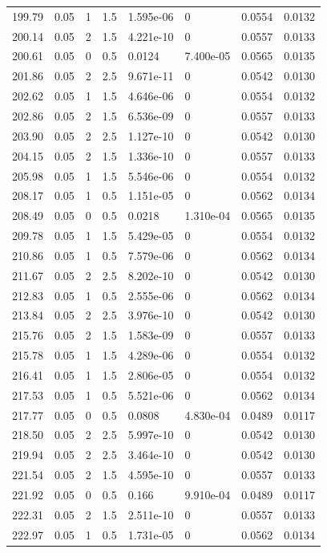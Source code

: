 \documentclass[preview]{standalone}
\begin{document}
{{{{\begin{tabular}{L{1.2cm}C{1.2cm} C{0.3cm}C{0.5cm} C{1.4cm}C{1.4cm} C{1.4cm}C{1.4cm}}
  199.79  &  0.05  & 1     & 1.5 &  1.595e-06  & 0  & 0.0554 &  0.0132   \\ 
  200.14  &  0.05  & 2     & 1.5 &  4.221e-10  & 0  & 0.0557 &  0.0133   \\ 
  200.61  &  0.05  & 0     & 0.5 &  0.0124  & 7.400e-05  & 0.0565 &  0.0135   \\ 
  201.86  &  0.05  & 2     & 2.5 &  9.671e-11  & 0  & 0.0542 &  0.0130   \\ 
  202.62  &  0.05  & 1     & 1.5 &  4.646e-06  & 0  & 0.0554 &  0.0132   \\ 
  202.86  &  0.05  & 2     & 1.5 &  6.536e-09  & 0  & 0.0557 &  0.0133   \\ 
  203.90  &  0.05  & 2     & 2.5 &  1.127e-10  & 0  & 0.0542 &  0.0130   \\ 
  204.15  &  0.05  & 2     & 1.5 &  1.336e-10  & 0  & 0.0557 &  0.0133   \\ 
  205.98  &  0.05  & 1     & 1.5 &  5.546e-06  & 0  & 0.0554 &  0.0132   \\ 
  208.17  &  0.05  & 1     & 0.5 &  1.151e-05  & 0  & 0.0562 &  0.0134   \\ 
  208.49  &  0.05  & 0     & 0.5 &  0.0218  & 1.310e-04  & 0.0565 &  0.0135   \\ 
  209.78  &  0.05  & 1     & 1.5 &  5.429e-05  & 0  & 0.0554 &  0.0132   \\ 
  210.86  &  0.05  & 1     & 0.5 &  7.579e-06  & 0  & 0.0562 &  0.0134   \\ 
  211.67  &  0.05  & 2     & 2.5 &  8.202e-10  & 0  & 0.0542 &  0.0130   \\ 
  212.83  &  0.05  & 1     & 0.5 &  2.555e-06  & 0  & 0.0562 &  0.0134   \\ 
  213.84  &  0.05  & 2     & 2.5 &  3.976e-10  & 0  & 0.0542 &  0.0130   \\ 
  215.76  &  0.05  & 2     & 1.5 &  1.583e-09  & 0  & 0.0557 &  0.0133   \\ 
  215.78  &  0.05  & 1     & 1.5 &  4.289e-06  & 0  & 0.0554 &  0.0132   \\ 
  216.41  &  0.05  & 1     & 1.5 &  2.806e-05  & 0  & 0.0554 &  0.0132   \\ 
  217.53  &  0.05  & 1     & 0.5 &  5.521e-06  & 0  & 0.0562 &  0.0134   \\ 
  217.77  &  0.05  & 0     & 0.5 &  0.0808  & 4.830e-04  & 0.0489 &  0.0117   \\ 
  218.50  &  0.05  & 2     & 2.5 &  5.997e-10  & 0  & 0.0542 &  0.0130   \\ 
  219.94  &  0.05  & 2     & 2.5 &  3.464e-10  & 0  & 0.0542 &  0.0130   \\ 
  221.54  &  0.05  & 2     & 1.5 &  4.595e-10  & 0  & 0.0557 &  0.0133   \\ 
  221.92  &  0.05  & 0     & 0.5 &  0.166  & 9.910e-04  & 0.0489 &  0.0117   \\ 
  222.31  &  0.05  & 2     & 1.5 &  2.511e-10  & 0  & 0.0557 &  0.0133   \\ 
  222.97  &  0.05  & 1     & 0.5 &  1.731e-05  & 0  & 0.0562 &  0.0134   \\ 
\hline 
\end{tabular} 

}}}}
\end{document}
